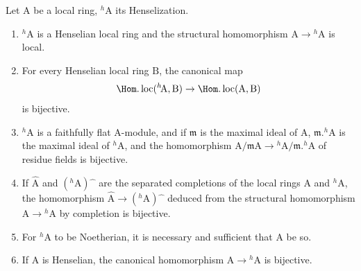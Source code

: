 \begin{theorem}[18.6.6]
\label{IV.18.6.6}
Let $\mathrm{A}$ be a local ring, ${}^h\!\mathrm{A}$ its Henselization.
\begin{enumerate}[label=\emph{\roman*)}]
  \item ${}^h\!\mathrm{A}$ is a Henselian local ring and the structural homomorphism $\mathrm{A}\to{}^h\!\mathrm{A}$ is local.
  \item For every Henselian local ring $\mathrm{B}$, the canonical map
  \[
    \Hom.\operatorname{loc}({}^h\!\mathrm{A},\mathrm{B})\to\Hom.\operatorname{loc}(\mathrm{A},\mathrm{B})
  \]
  is bijective.
  \item ${}^h\!\mathrm{A}$ is a faithfully flat A-module, and if $\mathfrak{m}$ is the maximal ideal of $\mathrm{A}$, $\mathfrak{m}.{}^h\!\mathrm{A}$ is the maximal ideal of ${}^h\!\mathrm{A}$, and the homomorphism $\mathrm{A}/\mathfrak{m}\mathrm{A}\to{}^h\!\mathrm{A}/\mathfrak{m}.{}^h\!\mathrm{A}$ of residue fields is bijective.
  \item If $\hat{\mathrm{A}}$ and $({}^h\!\mathrm{A})\hat{\phantom{x}}$ are the separated completions of the local rings $\mathrm{A}$ and ${}^h\!\mathrm{A}$, the homomorphism $\hat{\mathrm{A}}\to({}^h\!\mathrm{A})\hat{\phantom{x}}$ deduced from the structural homomorphism $\mathrm{A}\to{}^h\!\mathrm{A}$ by completion is bijective.
  \item For ${}^h\!\mathrm{A}$ to be Noetherian, it is necessary and sufficient that A be so.
  \item If A is Henselian, the canonical homomorphism $\mathrm{A}\to{}^h\!\mathrm{A}$ is bijective.
\end{enumerate}
\end{theorem}

